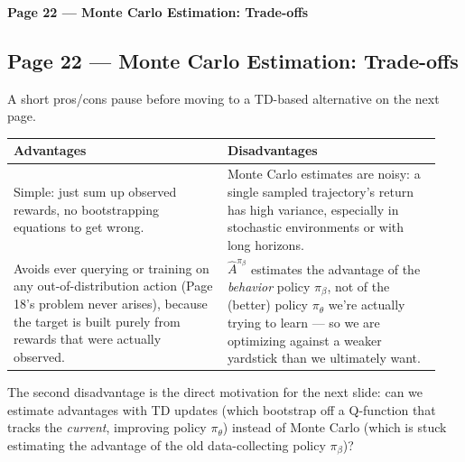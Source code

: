 \bigskip

\textbf{Page 22 --- Monte Carlo Estimation: Trade-offs}

\subsection*{Page 22 --- Monte Carlo Estimation: Trade-offs}

A short pros/cons pause before moving to a TD-based alternative on the next page.

\begin{center}
\begin{tabular}{@{}p{0.47\linewidth}p{0.47\linewidth}@{}}
\toprule
Advantages & Disadvantages \\
\midrule
Simple: just sum up observed rewards, no bootstrapping equations to get wrong. & Monte Carlo estimates are noisy: a single sampled trajectory's return has high variance, especially in stochastic environments or with long horizons. \\
Avoids ever querying or training on any out-of-distribution action (Page 18's problem never arises), because the target is built purely from rewards that were actually observed. & $\hat A^{\pi_\beta}$ estimates the advantage of the \emph{behavior} policy $\pi_\beta$, not of the (better) policy $\pi_\theta$ we're actually trying to learn --- so we are optimizing against a weaker yardstick than we ultimately want. \\
\bottomrule
\end{tabular}
\end{center}

The second disadvantage is the direct motivation for the next slide: can we estimate advantages with TD updates (which bootstrap off a Q-function that tracks the \emph{current}, improving policy $\pi_\theta$) instead of Monte Carlo (which is stuck estimating the advantage of the old data-collecting policy $\pi_\beta$)?
